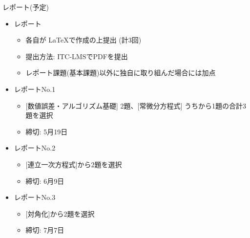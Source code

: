 \begin{frame}[t,fragile]{レポート(予定)}
  \begin{itemize}
  \item レポート
    \begin{itemize}
    \item 各自が \LaTeX で作成の上提出 (計3回)
    \item 提出方法: ITC-LMSでPDFを提出
    \item レポート課題(基本課題)以外に独自に取り組んだ場合には加点
    \end{itemize}
  \item レポートNo.1
    \begin{itemize}
    \item \mbox{} [数値誤差・アルゴリズム基礎] 2題、[常微分方程式] うちから1題の合計3題を選択
    \item 締切: 5月19日
    \end{itemize}
  \item レポートNo.2
    \begin{itemize}
    \item \mbox{} [連立一次方程式]から2題を選択
    \item 締切: 6月9日
    \end{itemize}
  \item レポートNo.3
    \begin{itemize}
    \item \mbox{} [対角化]から2題を選択
    \item 締切: 7月7日
    \end{itemize}
  \end{itemize}    
\end{frame}
  

